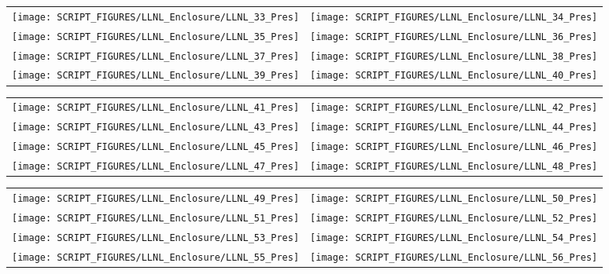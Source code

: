\begin{figure}[p]
\begin{tabular*}{\textwidth}{l@{\extracolsep{\fill}}r}
\texttt{[image: SCRIPT\_FIGURES/LLNL\_Enclosure/LLNL\_33\_Pres]} &
\texttt{[image: SCRIPT\_FIGURES/LLNL\_Enclosure/LLNL\_34\_Pres]} \\
\texttt{[image: SCRIPT\_FIGURES/LLNL\_Enclosure/LLNL\_35\_Pres]} &
\texttt{[image: SCRIPT\_FIGURES/LLNL\_Enclosure/LLNL\_36\_Pres]} \\
\texttt{[image: SCRIPT\_FIGURES/LLNL\_Enclosure/LLNL\_37\_Pres]} &
\texttt{[image: SCRIPT\_FIGURES/LLNL\_Enclosure/LLNL\_38\_Pres]} \\
\texttt{[image: SCRIPT\_FIGURES/LLNL\_Enclosure/LLNL\_39\_Pres]} &
\texttt{[image: SCRIPT\_FIGURES/LLNL\_Enclosure/LLNL\_40\_Pres]}
\end{tabular*}
\label{LLNL_Enclosure_Pres_5}
\end{figure}

\begin{figure}[p]
\begin{tabular*}{\textwidth}{l@{\extracolsep{\fill}}r}
\texttt{[image: SCRIPT\_FIGURES/LLNL\_Enclosure/LLNL\_41\_Pres]} &
\texttt{[image: SCRIPT\_FIGURES/LLNL\_Enclosure/LLNL\_42\_Pres]} \\
\texttt{[image: SCRIPT\_FIGURES/LLNL\_Enclosure/LLNL\_43\_Pres]} &
\texttt{[image: SCRIPT\_FIGURES/LLNL\_Enclosure/LLNL\_44\_Pres]} \\
\texttt{[image: SCRIPT\_FIGURES/LLNL\_Enclosure/LLNL\_45\_Pres]} &
\texttt{[image: SCRIPT\_FIGURES/LLNL\_Enclosure/LLNL\_46\_Pres]} \\
\texttt{[image: SCRIPT\_FIGURES/LLNL\_Enclosure/LLNL\_47\_Pres]} &
\texttt{[image: SCRIPT\_FIGURES/LLNL\_Enclosure/LLNL\_48\_Pres]}
\end{tabular*}
\label{LLNL_Enclosure_Pres_6}
\end{figure}

\begin{figure}[p]
\begin{tabular*}{\textwidth}{l@{\extracolsep{\fill}}r}
\texttt{[image: SCRIPT\_FIGURES/LLNL\_Enclosure/LLNL\_49\_Pres]} &
\texttt{[image: SCRIPT\_FIGURES/LLNL\_Enclosure/LLNL\_50\_Pres]} \\
\texttt{[image: SCRIPT\_FIGURES/LLNL\_Enclosure/LLNL\_51\_Pres]} &
\texttt{[image: SCRIPT\_FIGURES/LLNL\_Enclosure/LLNL\_52\_Pres]} \\
\texttt{[image: SCRIPT\_FIGURES/LLNL\_Enclosure/LLNL\_53\_Pres]} &
\texttt{[image: SCRIPT\_FIGURES/LLNL\_Enclosure/LLNL\_54\_Pres]} \\
\texttt{[image: SCRIPT\_FIGURES/LLNL\_Enclosure/LLNL\_55\_Pres]} &
\texttt{[image: SCRIPT\_FIGURES/LLNL\_Enclosure/LLNL\_56\_Pres]}
\end{tabular*}
\label{LLNL_Enclosure_Pres_7}
\end{figure}

